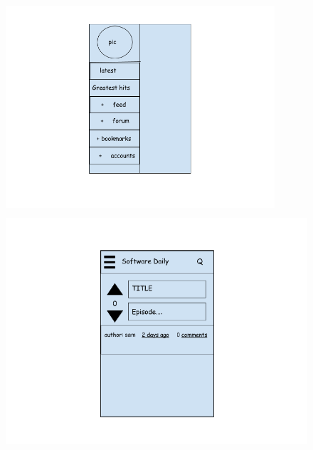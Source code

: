 \documentclass{article}
\begin{document}
\begin{figure}[h]
\centering
\begin{minipage}{.5\textwidth}
  \centering
  \includegraphics[width=10cm, height=8cm]{img/side_menu.png}
\end{minipage}%
\begin{minipage}{.7\textwidth}
  \centering
  \includegraphics[width=.9\linewidth]{img/forum.png}
\end{minipage}
\end{figure}
\end{document}
